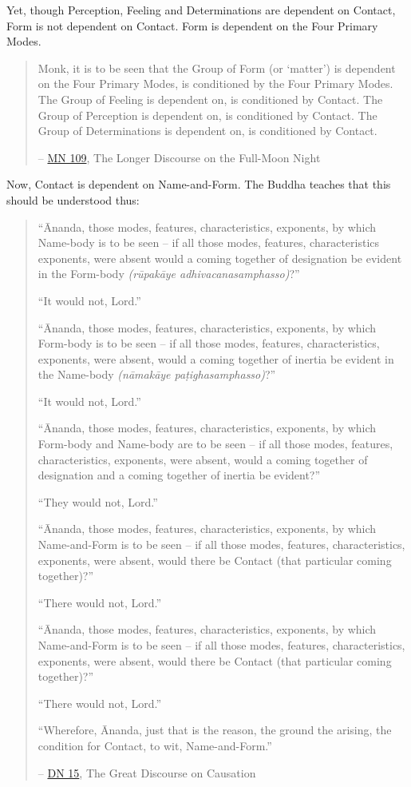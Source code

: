 Yet, though Perception, Feeling and Determinations are dependent on Contact, Form is not dependent on Contact. Form is dependent on the Four Primary Modes.

\begin{quote}
\protect\hypertarget{dependent}{}{}Monk, it is to be seen that the Group of Form (or `matter') is dependent on the Four Primary Modes, is conditioned by the Four Primary Modes. The Group of Feeling is dependent on, is conditioned by Contact. The Group of Perception is dependent on, is conditioned by Contact. The Group of Determinations is dependent on, is conditioned by Contact.

 -- \href{https://suttacentral.net/mn109/en/sujato}{MN 109}, The Longer Discourse on the Full-Moon Night
\end{quote}

Now, Contact is dependent on Name-and-Form. The Buddha teaches that this should be understood thus:

\begin{quote}
``Ānanda, those modes, features, characteristics, exponents, by which Name-body is to be seen -- if all those modes, features, characteristics exponents, were absent would a coming together of designation be evident in the Form-body \emph{(rūpakāye adhivacanasamphasso)}?''

``It would not, Lord.''

``Ānanda, those modes, features, characteristics, exponents, by which Form-body is to be seen -- if all those modes, features, characteristics, exponents, were absent, would a coming together of inertia be evident in the Name-body \emph{(nāmakāye paṭighasamphasso)}?''

``It would not, Lord.''

``Ānanda, those modes, features, characteristics, exponents, by which Form-body and Name-body are to be seen -- if all those modes, features, characteristics, exponents, were absent, would a coming together of designation and a coming together of inertia be evident?''

``They would not, Lord.''

``Ānanda, those modes, features, characteristics, exponents, by which Name-and-Form is to be seen -- if all those modes, features, characteristics, exponents, were absent, would there be Contact (that particular coming together)?''

``There would not, Lord.''

``Ānanda, those modes, features, characteristics, exponents, by which Name-and-Form is to be seen -- if all those modes, features, characteristics, exponents, were absent, would there be Contact (that particular coming together)?''

``There would not, Lord.''

``Wherefore, Ānanda, just that is the reason, the ground the arising, the condition for Contact, to wit, Name-and-Form.''

 -- \href{https://suttacentral.net/dn15/en/bodhi}{DN 15}, The Great Discourse on Causation
\end{quote}

